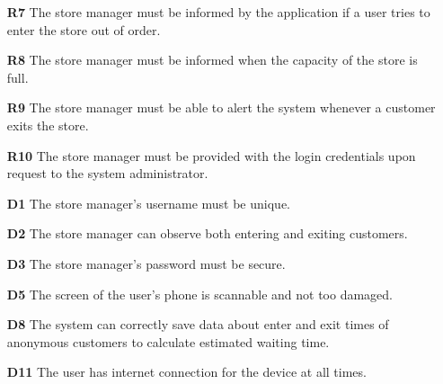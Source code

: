 \begin{enumerate}
\begin{enumerate}
		\item [\textbf{R7}] The store manager must be informed by the application if a user tries to enter the store out of order.
		\item [\textbf{R8}] The store manager must be informed when the capacity of the store is full.
		\item [\textbf{R9}] The store manager must be able to alert the system whenever a customer exits the store.
		\item [\textbf{R10}] The store manager must be provided with the login credentials upon request to the system administrator.
		\item [\textbf{D1}] The store manager's username must be unique. 
		\item [\textbf{D2}] The store manager can observe both entering and exiting customers.
		\item [\textbf{D3}] The store manager's password must be secure. 
		\item [\textbf{D5}] The screen of the user's phone is scannable and not too damaged.
		\item [\textbf{D8}] The system can correctly save data about enter and exit times of anonymous customers to calculate estimated waiting time.
		\item [\textbf{D11}] The user has internet connection for the device at all times.



\end{enumerate}
\end{enumerate}
